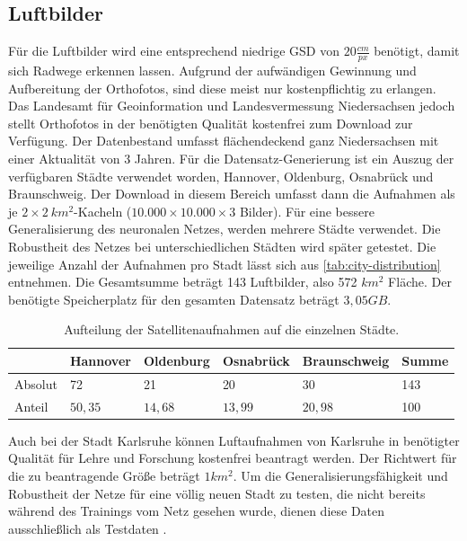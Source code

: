\subsection{Luftbilder}

Für die Luftbilder wird eine entsprechend niedrige \ac{GSD} von $20 \frac{cm}{px}$ benötigt, damit sich Radwege erkennen lassen. 
Aufgrund der aufwändigen Gewinnung und Aufbereitung der Orthofotos, sind diese meist nur kostenpflichtig zu erlangen.
Das Landesamt für Geoinformation und Landesvermessung Niedersachsen jedoch stellt Orthofotos in der benötigten Qualität kostenfrei zum Download zur Verfügung.
Der Datenbestand umfasst flächendeckend ganz Niedersachsen mit einer Aktualität von 3 Jahren.
Für die Datensatz-Generierung ist ein Auszug der verfügbaren Städte verwendet worden, Hannover, Oldenburg, Osnabrück und Braunschweig. 
Der Download in diesem Bereich umfasst dann die Aufnahmen als je $2{\times}2 ~km^2$-Kacheln ($10.000{\times}10.000{\times}3$ Bilder)\cite{.26.10.2022}.
Für eine bessere Generalisierung des neuronalen Netzes, werden mehrere Städte verwendet. Die Robustheit des Netzes 
bei unterschiedlichen Städten wird später getestet.
Die jeweilige Anzahl der Aufnahmen pro Stadt lässt sich aus \autoref{tab:city-distribution} entnehmen.
Die Gesamtsumme beträgt 143 Luftbilder, also 572 $km^2$ Fläche.
Der benötigte Speicherplatz für den gesamten Datensatz beträgt $3,05 GB$.

\begin{table}
	\centering
	\begin{tabular}{l|l|l|l|l|l}
		& Hannover & Oldenburg & Osnabrück & Braunschweig & Summe\\
		\midrule
		Absolut & 72 & 21 & 20 & 30 & 143\\
		Anteil & $50,35$ & $14,68$ & $13,99$ & $20,98$ & 100 \\
	\end{tabular}
	\caption{Aufteilung der Satellitenaufnahmen auf die einzelnen Städte.}
	\label{tab:city-distribution}
\end{table}

Auch bei der Stadt Karlsruhe können Luftaufnahmen von Karlsruhe in benötigter Qualität für Lehre und Forschung kostenfrei beantragt werden.
Der Richtwert für die zu beantragende Größe beträgt $1km^2$.
Um die Generalisierungsfähigkeit und Robustheit der Netze für eine völlig neuen Stadt zu testen, 
die nicht bereits während des Trainings vom Netz gesehen wurde,  
dienen diese Daten ausschließlich als Testdaten \cite{.04.12.2022}.


